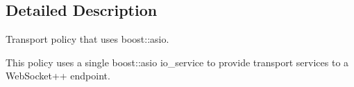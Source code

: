 \subsection{Detailed Description}
Transport policy that uses boost\+::asio. 

This policy uses a single boost\+::asio io\+\_\+service to provide transport services to a Web\+Socket++ endpoint. 